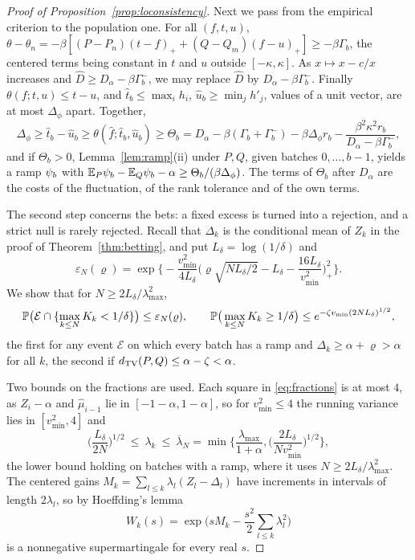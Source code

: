\begin{proof}[Proof of Proposition~\ref{prop:loconsistency}]
Next we pass from the empirical criterion to the population one. For all $(f,t,u)$,
$\theta-\theta_n=-\beta[(P-P_n)(t-f)_++(Q-Q_m)(f-u)_+]\ge-\beta\Gamma_b$, the centered terms being constant in $t$
and $u$ outside $[-\kappa,\kappa]$. As $x\mapsto x-c/x$ increases and $\widehat D\ge D_\alpha-\beta\Gamma_b^-$, we may
replace $\widehat D$ by $D_\alpha-\beta\Gamma_b^-$. Finally $\theta(f;t,u)\le t-u$, and $\widehat t_b\le\max_ih_i$,
$\widehat u_b\ge\min_jh'_j$, values of a unit vector, are at most $\Delta_\phi$ apart. Together,
\begin{equation}
\Delta_\phi\ge\widehat t_b-\widehat u_b\ge\theta(\widehat f;\widehat t_b,\widehat u_b)\ge\Theta_b=D_\alpha-\beta(\Gamma_b
+\Gamma_b^-)-\beta \Delta_\phi r_b-\frac{\beta^2\kappa^2r_b}{D_\alpha-\beta\Gamma_b^-},
\label{eq:fittedramp}
\end{equation}
and if $\Theta_b>0$, Lemma~\ref{lem:ramp}(ii) under $P,Q$, given batches $0,\dots,b-1$, yields a ramp $\psi_b$ with
$\mathbb{E}_P\psi_b-\mathbb{E}_Q\psi_b-\alpha\ge\Theta_b/(\beta \Delta_\phi)$. The terms of $\Theta_b$ after $D_\alpha$ are the costs of the
fluctuation, of the rank tolerance and of the own terms.

The second step concerns the bets: a fixed excess is turned into a rejection, and a strict null is rarely rejected.
Recall that $\Delta_k$ is the conditional mean of $Z_k$ in the proof of Theorem~\ref{thm:betting}, and put
$L_\delta=\log(1/\delta)$ and
\[
\varepsilon_N(\varrho)=\exp\Big\{-\frac{v^2_{\min}}{4L_\delta}\Big(\varrho\sqrt{NL_\delta/2}-L_\delta
-\frac{16L_\delta}{v^2_{\min}}\Big)_+^2\Big\}.
\]
We show that for $N\ge2L_\delta/\lambda_{\max}^2$,
\begin{equation}
\mathbb{P}\big(\mathcal E\cap\{\max_{k\le N}K_k<1/\delta\}\big)\le\varepsilon_N(\varrho),\qquad
\mathbb{P}\big(\max_{k\le N}K_k\ge1/\delta\big)\le e^{-\zeta v_{\min}(2NL_\delta)^{1/2}},
\label{eq:betbounds}
\end{equation}
the first for any event $\mathcal E$ on which every batch has a ramp and $\Delta_k\ge\alpha+\varrho>\alpha$ for all $k$,
the second if $d_{\mathrm{TV}}(P,Q)\le\alpha-\zeta<\alpha$.

Two bounds on the fractions are used. Each square in \eqref{eq:fractions} is at most $4$, as $Z_i-\alpha$ and
$\widehat\mu_{i-1}$ lie in $[-1-\alpha,1-\alpha]$, so for $v^2_{\min}\le4$ the running variance lies in
$[v^2_{\min},4]$ and
\[
\Big(\frac{L_\delta}{2N}\Big)^{1/2}\ \le\ \lambda_k\ \le\ \overline\lambda_N
=\min\Big\{\frac{\lambda_{\max}}{1+\alpha},\Big(\frac{2L_\delta}{Nv^2_{\min}}\Big)^{1/2}\Big\},
\]
the lower bound holding on batches with a ramp, where it uses $N\ge2L_\delta/\lambda_{\max}^2$. The centered gains
$M_k=\sum_{l\le k}\lambda_l(Z_l-\Delta_l)$ have increments in intervals of length $2\lambda_l$, so by Hoeffding's
lemma \citep{hoeffding1963}
\[
W_k(s)=\exp\Big(sM_k-\frac{s^2}2\sum_{l\le k}\lambda_l^2\Big)
\]
is a nonnegative supermartingale for every real $s$.


\end{proof}
